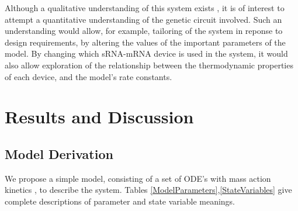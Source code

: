 \documentclass[10pt,journal]{./IEEE_latex_class/IEEEtran}
\begin{document}
Although a qualitative understanding of this system exists \cite{Rodrigo2012}, it is of interest to attempt a quantitative understanding of the genetic circuit involved. Such an understanding would allow, for example, tailoring of the system in reponse to design requirements, by altering the values of the important parameters of the model. By changing which sRNA-mRNA device is used in the system, it would also allow exploration of the relationship between the thermodynamic properties of each device, and the model's rate constants.
 



\section{Results and Discussion}
\label{Results and Discussion}



\subsection{Model Derivation}
We propose a simple model, consisting of a set of ODE's with mass action kinetics \cite{UriAlon}, to describe the system. Tables \ref{ModelParameters},\ref{StateVariables} give complete descriptions of parameter and state variable meanings.
 
\end{document}
